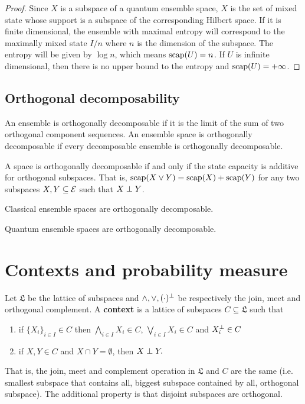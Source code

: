 \begin{proof}
	Since $X$ is a subspace of a quantum ensemble space, $X$ is the set of mixed state whose support is a subspace of the corresponding Hilbert space. If it is finite dimensional, the ensemble with maximal entropy will correspond to the maximally mixed state $I/n$ where $n$ is the dimension of the subspace. The entropy will be given by $\log n$, which means $\mathrm{scap}(U) = n$. If $U$ is infinite dimensional, then there is no upper bound to the entropy and $\mathrm{scap}(U) = + \infty$.
\end{proof}

\subsection{Orthogonal decomposability}

\begin{defn}
	An ensemble is orthogonally decomposable if it is the limit of the sum of two orthogonal component sequences. An ensemble space is orthogonally decomposable if every decomposable ensemble is orthogonally decomposable.
\end{defn}

\begin{conj}
	A space is orthogonally decomposable if and only if the state capacity is additive for orthogonal subspaces. That is, $\mathrm{scap}(X \vee Y) = \mathrm{scap}(X) + \mathrm{scap}(Y)$ for any two subspaces $X, Y \subseteq \mathcal{E}$ such that $X \perp Y$.
\end{conj}

\begin{conj}
	Classical ensemble spaces are orthogonally decomposable.
\end{conj}

\begin{conj}
	Quantum ensemble spaces are orthogonally decomposable.
\end{conj}

\section{Contexts and probability measure}

\begin{defn}
	Let $\mathfrak{L}$ be the lattice of subspaces and $\wedge, \vee, (\cdot)^\perp$ be respectively the join, meet and orthogonal complement. A \textbf{context} is a lattice of subspaces $C \subseteq \mathfrak{L}$ such that
	\begin{enumerate}
		\item if $\{X_i\}_{i \in I} \in C$ then $\bigwedge_{i \in I} X_i \in C$, $\bigvee_{i \in I} X_i \in C$ and $X_i^\perp \in C$
		\item if $X, Y \in C$ and $X \cap Y = \emptyset$, then $X \perp Y.$
	\end{enumerate}
	That is, the join, meet and complement operation in $\mathfrak{L}$ and $C$ are the same (i.e. smallest subspace that contains all, biggest subspace contained by all, orthogonal subspace). The additional property is that disjoint subspaces are orthogonal.
\end{defn}

